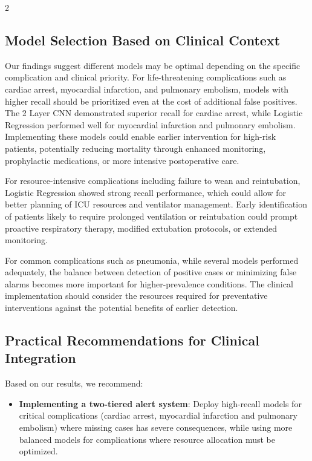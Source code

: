 \documentclass[bst/sn-nature]{sn-jnl}
\begin{document}
\begin{multicols}{2}
\begin{table}[htbp]
\vspace{1.5cm}
\caption{Confusion Matrices for Reintubation, Pneumonia and Failure to Wean Best Performing Models by AUC and Recall Scores.}
\label{tab:confusion-matrices2}
\end{table}

\subsection{Model Selection Based on Clinical Context}

\quad Our findings suggest different models may be optimal depending on the specific complication and clinical priority. For life-threatening complications such as cardiac arrest, myocardial infarction, and pulmonary embolism, models with higher recall should be prioritized even at the cost of additional false positives. The 2 Layer CNN demonstrated superior recall for cardiac arrest, while Logistic Regression performed well for myocardial infarction and pulmonary embolism. Implementing these models could enable earlier intervention for high-risk patients, potentially reducing mortality through enhanced monitoring, prophylactic medications, or more intensive postoperative care.


For resource-intensive complications including failure to wean and reintubation, Logistic Regression showed strong recall performance, which could allow for better planning of ICU resources and ventilator management. Early identification of patients likely to require prolonged ventilation or reintubation could prompt proactive respiratory therapy, modified extubation protocols, or extended monitoring.

For common complications such as pneumonia, while several models performed adequately, the balance between detection
of positive cases or minimizing false alarms becomes more important for higher-prevalence conditions. The clinical implementation should consider the resources required for preventative interventions against the potential benefits of earlier detection.

\subsection{Practical Recommendations for Clinical Integration}

\quad Based on our results, we recommend:

\begin{itemize}
    \item \textbf{Implementing a two-tiered alert system}: Deploy high-recall models for critical complications (cardiac arrest, myocardial infarction and pulmonary embolism) where missing cases has severe consequences, while using more balanced models for complications where resource allocation must be optimized. \\
    

\end{itemize}
\end{multicols}
\end{document}
